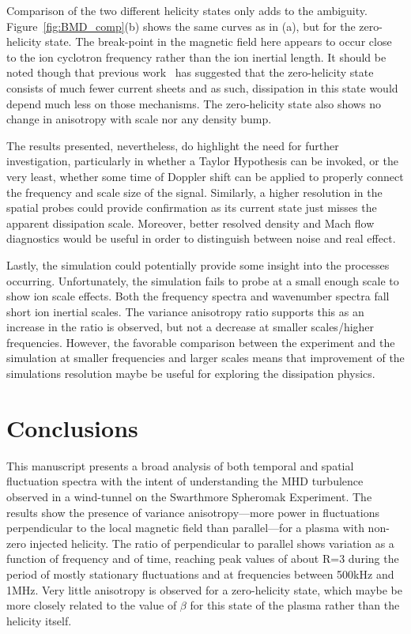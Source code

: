 \documentclass[aip,prl,amsmath,amssymb,reprint,superscriptaddress]{revtex4-1} %
\begin{document}
Comparison of the two different helicity states only adds to the ambiguity. Figure~\ref{fig:BMD_comp}(b) shows the same curves as in (a), but for the zero-helicity state. The break-point in the magnetic field here appears to occur close to the ion cyclotron frequency rather than the ion inertial length. It should be noted though that previous work~\cite{schaffner14b} has suggested that the zero-helicity state consists of much fewer current sheets and as such, dissipation in this state would depend much less on those mechanisms. The zero-helicity state also shows no change in anisotropy with scale nor any density bump.

The results presented, nevertheless, do highlight the need for further investigation, particularly in whether a Taylor Hypothesis can be invoked, or the very least, whether some time of Doppler shift can be applied to properly connect the frequency and scale size of the signal. Similarly, a higher resolution in the spatial probes could provide confirmation as its current state just misses the apparent dissipation scale. Moreover, better resolved density and Mach flow diagnostics would be useful in order to distinguish between noise and real effect.

Lastly, the simulation could potentially provide some insight into the processes occurring. Unfortunately, the simulation fails to probe at a small enough scale to show ion scale effects. Both the frequency spectra and wavenumber spectra fall short ion inertial scales. The variance anisotropy ratio supports this as an increase in the ratio is observed, but not a decrease at smaller scales/higher frequencies. However, the favorable comparison between the experiment and the simulation at smaller frequencies and larger scales means that improvement of the simulations resolution maybe be useful for exploring the dissipation physics.

\section{Conclusions}\label{sec:conclusions}

This manuscript presents a broad analysis of both temporal and spatial fluctuation spectra with the intent of understanding the MHD turbulence observed in a wind-tunnel on the Swarthmore Spheromak Experiment. The results show the presence of variance anisotropy---more power in fluctuations perpendicular to the local magnetic field than parallel---for a plasma with non-zero injected helicity. The ratio of perpendicular to parallel shows variation as a function of frequency and of time, reaching peak values of about R=3 during the period of mostly stationary fluctuations and at frequencies between 500kHz and 1MHz. Very little anisotropy is observed for a zero-helicity state, which maybe be more closely related to the value of $\beta$ for this state of the plasma rather than the helicity itself.
\end{document}
